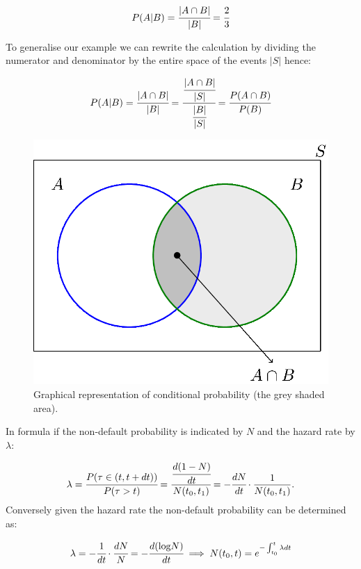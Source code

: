\[P(A|B) = \cfrac{|A\cap B|}{|B|} = \cfrac{2}{3}\]

To generalise our example we can rewrite the calculation by dividing the
numerator and denominator by the entire space of the events \(|S|\)
hence:

\[P(A|B) = \cfrac{|A\cap B|}{|B|} = \cfrac{\cfrac{|A\cap B|}{|S|}}{\cfrac{|B|}{|S|}} = \cfrac{P(A\cap B)}{P(B)}\]

\begin{figure}[tb]
\centering
\includegraphics[width=0.7\linewidth]{conditional_b.png}
\caption{Graphical representation of conditional probability (the grey shaded area).}
\end{figure}

In formula if the non-default probability is indicated by \(N\) and the
hazard rate by \(\lambda\):

\[\lambda = \cfrac{P(\tau\in (t, t+dt))}{P(\tau>t)} = \cfrac{\cfrac{d(1-N)}{dt}}{N(t_0, t_1)} = -\cfrac{dN}{dt}\cdot\frac{1}{N(t_0, t_1)}.\]
Conversely given the hazard rate the non-default probability can be
determined as:

\[\lambda = -\cfrac{1}{dt}\cdot\cfrac{dN}{N} = -\cfrac{d(\textrm{log}N)}{dt} \implies N(t_0, t) = e^{-\int_{t_0}^{t}\lambda dt}\]

